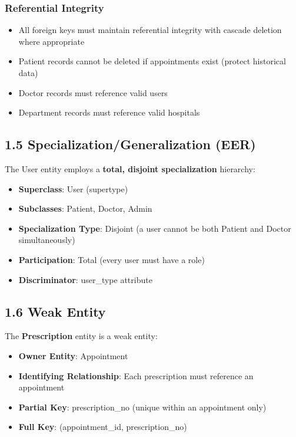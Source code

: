 \subsubsection*{Referential Integrity}
\begin{itemize}
    \item All foreign keys must maintain referential integrity with cascade deletion where appropriate
    \item Patient records cannot be deleted if appointments exist (protect historical data)
    \item Doctor records must reference valid users
    \item Department records must reference valid hospitals
\end{itemize}

\subsection*{1.5 Specialization/Generalization (EER)}

The User entity employs a \textbf{total, disjoint specialization} hierarchy:

\begin{itemize}
    \item \textbf{Superclass}: User (supertype)
    \item \textbf{Subclasses}: Patient, Doctor, Admin
    \item \textbf{Specialization Type}: Disjoint (a user cannot be both Patient and Doctor simultaneously)
    \item \textbf{Participation}: Total (every user must have a role)
    \item \textbf{Discriminator}: user\_type attribute
\end{itemize}

\subsection*{1.6 Weak Entity}

The \textbf{Prescription} entity is a weak entity:

\begin{itemize}
    \item \textbf{Owner Entity}: Appointment
    \item \textbf{Identifying Relationship}: Each prescription must reference an appointment
    \item \textbf{Partial Key}: prescription\_no (unique within an appointment only)
    \item \textbf{Full Key}: (appointment\_id, prescription\_no)
\end{itemize}

